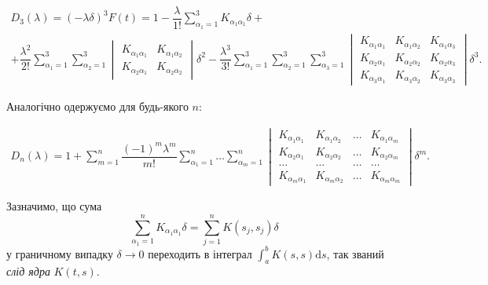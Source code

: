 \documentclass[14pt,twoside]{extreport}
\theoremstyle{mystyle}
\numberwithin{equation}{chapter}
\begin{document}
\begin{multline*}
D_3(\lambda)=(-\lambda\delta)^3 F(t)= 1 -
\dfrac{\lambda}{1!}\sum\limits_{\alpha_1=1}^{3}K_{\alpha_1\alpha_1}\delta +\\
+\dfrac{\lambda^2}{2!}
\sum\limits_{\alpha_1=1}^{3}\sum\limits_{\alpha_2=1}^{3}
\begin{vmatrix}
K_{\alpha_1\alpha_1} & K_{\alpha_1\alpha_2}\\
K_{\alpha_2\alpha_1} & K_{\alpha_2\alpha_2}
\end{vmatrix}\delta^2-
\dfrac{\lambda^3}{3!}\sum\limits_{\alpha_1=1}^{3}\sum\limits_{\alpha_2=1}^{3}\sum\limits_{\alpha_3=1}^{3}
\begin{vmatrix}
K_{\alpha_1\alpha_1} & K_{\alpha_1\alpha_2} & K_{\alpha_1\alpha_3}\\
K_{\alpha_2\alpha_1} & K_{\alpha_2\alpha_2} & K_{\alpha_2\alpha_3}\\
K_{\alpha_3\alpha_1} & K_{\alpha_3\alpha_2} & K_{\alpha_3\alpha_3}
\end{vmatrix}\delta^3.
\end{multline*}

Аналогічно одержуємо для будь-якого $n$:

\[
\begin{array}{l}
D_n(\lambda)= 1 +
\sum\limits_{m=1}^{n}\dfrac{(-1)^m\lambda^m}{m!}\sum\limits_{\alpha_1=1}^{n}\ldots\sum\limits_{\alpha_m=1}^{n}
\begin{vmatrix}
K_{\alpha_1\alpha_1} & K_{\alpha_1\alpha_2} & \ldots & K_{\alpha_1\alpha_m}\\
K_{\alpha_2\alpha_1} & K_{\alpha_2\alpha_2} & \ldots & K_{\alpha_2\alpha_m}\\
\ldots & \ldots & \ldots & \ldots\\
K_{\alpha_m\alpha_1} & K_{\alpha_m\alpha_2} & \ldots & K_{\alpha_m\alpha_m}
\end{vmatrix}\delta^m.
\end{array}
\]

Зазначимо, що сума
\[
 \sum\limits_{\alpha_1=1}^{n}K_{\alpha_1\alpha_1}\delta = \sum\limits_{j=1}^{n}K(s_j, s_j)\delta
\]
у граничному випадку $\delta \to 0$ переходить в інтеграл $\int_{a}^{b} K(s, s) \mathrm{d}s$, так званий \emph{слід ядра} $K(t,s)$.
\end{document}
